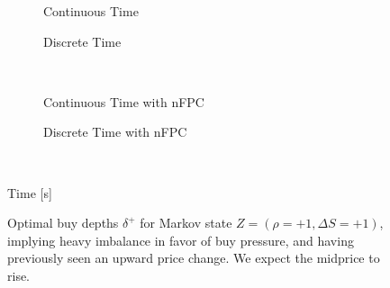\begin{figure}%
\centering%
\begin{subfigure}[b]{.4\linewidth}%
  \setlength\figureheight{\linewidth}%
  \setlength\figurewidth{\linewidth}%
  \caption{Continuous Time}%
\end{subfigure}%
\hspace{1.5cm}%
\begin{subfigure}[b]{.4\linewidth}%
  \setlength\figureheight{\linewidth}%
  \setlength\figurewidth{\linewidth}%
  \caption{Discrete Time}%
\end{subfigure}\\%
\vspace{1cm}%
\begin{subfigure}[b]{.4\linewidth}%
  \setlength\figureheight{\linewidth}%
  \setlength\figurewidth{\linewidth}%
  \caption{Continuous Time with nFPC}%
\end{subfigure}%
\hspace{1.5cm}%
\begin{subfigure}[b]{.4\linewidth}%
  \setlength\figureheight{\linewidth}%
  \setlength\figurewidth{\linewidth}%
  \caption{Discrete Time with nFPC}%
\end{subfigure}\\%
%
\leavevmode{}\hspace{0pt plus 1filll}\null%

Time [s]

\vspace{1cm}%
\begin{subfigure}{\linewidth}%
  \centering%
\end{subfigure}%
  \caption[Optimal buy LO depths for buy pressure imbalance]{Optimal buy depths $\delta^{+}$ for Markov state $Z=(\rho = +1, \Delta S = +1)$, implying heavy imbalance in favor of buy pressure, and having previously seen an upward price change. We expect the midprice to rise.}\label{fig:comp_dp_z15}%
\end{figure}

